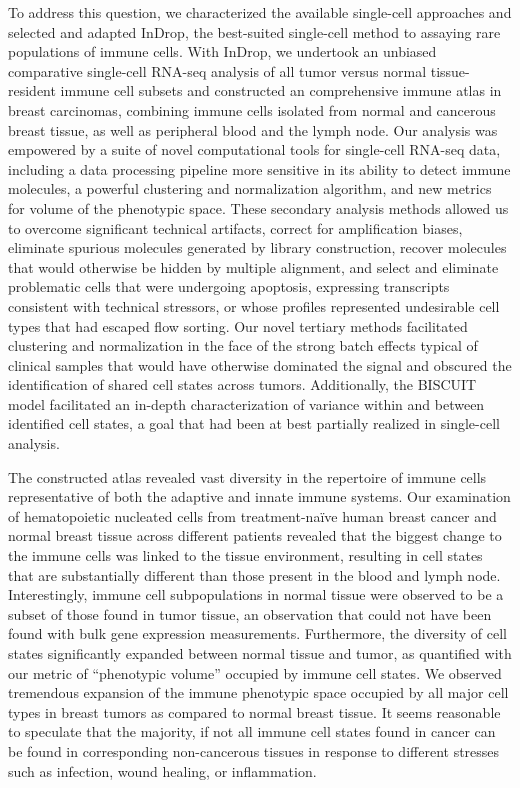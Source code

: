 To address this question, we characterized the available single-cell approaches and selected and adapted InDrop, the best-suited single-cell method to assaying rare populations of immune cells. 
With InDrop, we undertook an unbiased comparative single-cell RNA-seq analysis of all tumor versus normal tissue-resident immune cell subsets and constructed an comprehensive immune atlas in breast carcinomas, combining immune cells isolated from normal and cancerous breast tissue, as well as peripheral blood and the lymph node. 
Our analysis was empowered by a suite of novel computational tools for single-cell RNA-seq data, including a data processing pipeline more sensitive in its ability to detect immune molecules, a powerful clustering and normalization algorithm, and new metrics for volume of the phenotypic space.  
These secondary analysis methods allowed us to overcome significant technical artifacts, correct for amplification biases, eliminate spurious molecules generated by library construction, recover molecules that would otherwise be hidden by multiple alignment, and select and eliminate problematic cells that were undergoing apoptosis, expressing transcripts consistent with technical stressors, or whose profiles represented undesirable cell types that had escaped flow sorting. 
Our novel tertiary methods facilitated clustering and normalization in the face of the strong batch effects typical of clinical samples that would have otherwise dominated the signal and obscured the identification of shared cell states across tumors. 
Additionally, the BISCUIT model facilitated an in-depth characterization of variance within and between identified cell states, a goal that had been at best partially realized in single-cell analysis. 

The constructed atlas revealed vast diversity in the repertoire of immune cells representative of both the adaptive and innate immune systems. 
Our examination of hematopoietic nucleated cells from treatment-naïve human breast cancer and normal breast tissue across different patients revealed that the biggest change to the immune cells was linked to the tissue environment, resulting in cell states that are substantially different than those present in the blood and lymph node. 
Interestingly, immune cell subpopulations in normal tissue were observed to be a subset of those found in tumor tissue, an observation that could not have been found with bulk gene expression measurements. 
Furthermore, the diversity of cell states significantly expanded between normal tissue and tumor, as quantified with our metric of ``phenotypic volume'' occupied by immune cell states. 
We observed tremendous expansion of the immune phenotypic space occupied by all major cell types in breast tumors as compared to normal breast tissue. 
It seems reasonable to speculate that the majority, if not all immune cell states found in cancer can be found in corresponding non-cancerous tissues in response to different stresses such as infection, wound healing, or inflammation.

